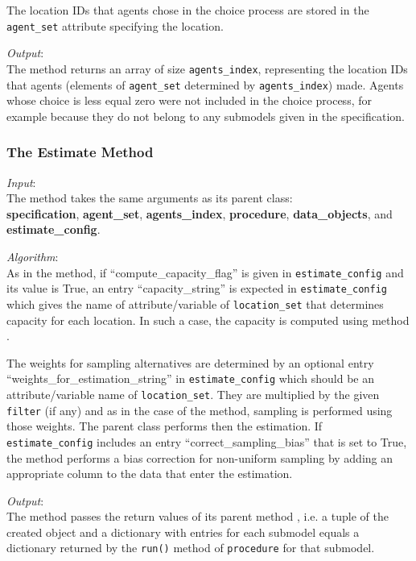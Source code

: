 The location IDs that agents chose in the choice process are stored
in the \verb|agent_set| attribute specifying the location.

{\it Output}:\\[1mm]
The method returns an array of size \verb|agents_index|,
representing the location IDs that agents (elements of
\verb|agent_set| determined by \verb|agents_index|) made. Agents
whose choice is less equal zero were not included in the choice
process, for example because they do not belong to any submodels
given in the specification.


\subsubsection{The Estimate Method}
%
{\it Input}:~\\[1mm]
The  method takes the same arguments as its parent class:\\
{\bf specification}, {\bf agent_set}, {\bf agents_index}, {\bf procedure},
{\bf data_objects}, and {\bf estimate_config}.

{\it Algorithm}:\\[1mm]
As in the  method, if ``compute_capacity_flag'' is given in
\verb|estimate_config| and its value is True, an entry ``capacity_string'' is
expected in \verb|estimate_config| which gives the name of attribute/variable \attributesindex\variablesindex
of \verb|location_set| that determines capacity for each location. In such a
case, the capacity is computed using method
.

The weights for sampling alternatives are determined by an optional entry
``weights_for_estimation_string'' in \verb|estimate_config| which should be an
attribute/variable \attributesindex\variablesindex name of \verb|location_set|. They are multiplied by the
given \verb|filter| (if any) and as in the case of the  method,
sampling is performed using those weights. The parent class performs then the
estimation. If \verb|estimate_config| includes an entry
``correct_sampling_bias'' that is set to True, the method performs a bias
correction for non-uniform sampling by adding an appropriate column to the
data that enter the estimation.

{\it Output}:\\[1mm]
The method passes the return values of its parent method ,
i.e. a tuple of the created  object and a
dictionary with entries for each submodel equals a dictionary returned by the
\verb|run()| method of \verb|procedure| for that submodel.

